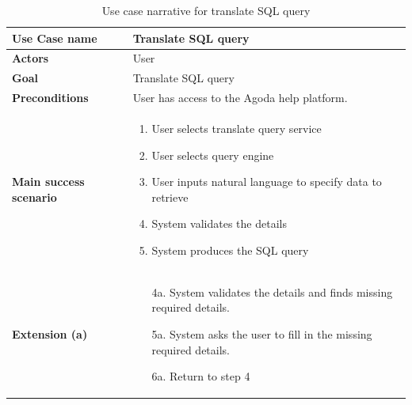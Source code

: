     \begin{table}[H]
        \centering
        \caption{Use case narrative for translate SQL query}
        \label{tbl:use-case-translate-sql}
        \begin{tabular}{|p{4cm}|p{10cm}|}
        \hline
        \textbf{Use Case name} & Translate SQL query \\ \hline
        \textbf{Actors} & User \\ \hline
        \textbf{Goal} & Translate SQL query \\ \hline
        \textbf{Preconditions} & User has access to the Agoda help platform. \\ \hline
        \textbf{Main success scenario} &
        \begin{enumerate}
            \item User selects translate query service
            \item User selects query engine
            \item User inputs natural language to specify data to retrieve
            \item System validates the details
            \item System produces the SQL query
        \end{enumerate}
        \\ \hline
        \textbf{Extension (a)} &
        \begin{enumerate}
            \item[4a.] System validates the details and finds missing required details.
            \item[5a.] System asks the user to fill in the missing required details.
            \item[6a.] Return to step 4
        \end{enumerate}
        \\ \hline
        \end{tabular}
    \end{table}
